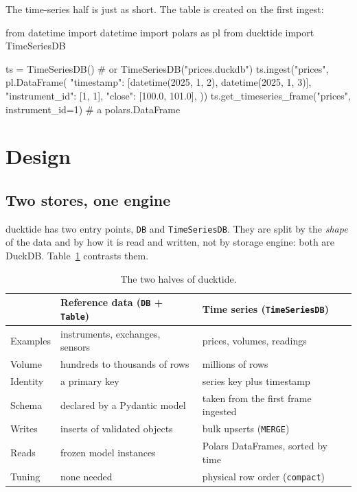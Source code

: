\documentclass[11pt,a4paper]{article}
\newcommand{\code}[1]{\texttt{#1}}
\begin{document}
The time-series half is just as short. The table is created on the first ingest:

\begin{python}
from datetime import datetime
import polars as pl
from ducktide import TimeSeriesDB

ts = TimeSeriesDB()                                   # or TimeSeriesDB("prices.duckdb")
ts.ingest("prices", pl.DataFrame({
    "timestamp": [datetime(2025, 1, 2), datetime(2025, 1, 3)],
    "instrument_id": [1, 1],
    "close": [100.0, 101.0],
}))
ts.get_timeseries_frame("prices", instrument_id=1)    # a polars.DataFrame
\end{python}

\section{Design}

\subsection{Two stores, one engine}

ducktide has two entry points, \code{DB} and \code{TimeSeriesDB}. They are split by the
\emph{shape} of the data and by how it is read and written, not by storage engine:
both are DuckDB. Table~\ref{tab:two} contrasts them.

\begin{table}[h]
\centering\small
\begin{tabularx}{\linewidth}{@{}l X X@{}}
\toprule
 & \textbf{Reference data} (\code{DB} + \code{Table}) & \textbf{Time series} (\code{TimeSeriesDB}) \\
\midrule
Examples      & instruments, exchanges, sensors & prices, volumes, readings \\
Volume        & hundreds to thousands of rows   & millions of rows \\
Identity      & a primary key                   & series key plus timestamp \\
Schema        & declared by a Pydantic model    & taken from the first frame ingested \\
Writes        & inserts of validated objects    & bulk upserts (\code{MERGE}) \\
Reads         & frozen model instances          & Polars DataFrames, sorted by time \\
Tuning        & none needed                     & physical row order (\code{compact}) \\
\bottomrule
\end{tabularx}
\caption{The two halves of ducktide.}
\label{tab:two}
\end{table}
\end{document}
